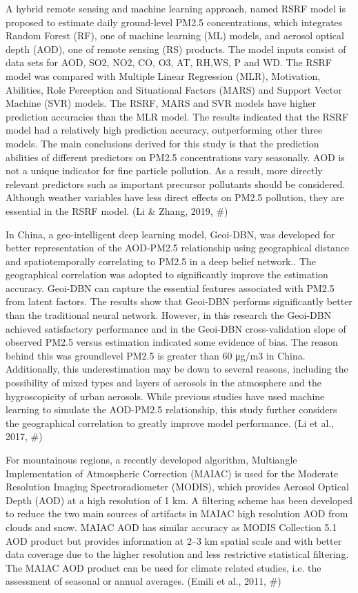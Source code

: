 A hybrid remote sensing and machine learning approach, named RSRF model is proposed to estimate daily ground-level PM2.5 concentrations, which integrates Random Forest (RF), one of machine learning (ML) models, and aerosol optical depth (AOD), one of remote sensing (RS) products. The model inputs consist of data sets for AOD, SO2, NO2, CO, O3, AT, RH,WS, P and WD. The RSRF model was compared with Multiple Linear Regression (MLR), Motivation, Abilities, Role Perception and Situational Factors (MARS) and Support Vector Machine (SVR) models. The RSRF, MARS and SVR models have higher prediction accuracies than the MLR model. The results indicated that the RSRF model had a relatively high prediction accuracy, outperforming other three models. The main conclusions derived for this study is that the prediction abilities of different predictors on PM2.5 concentrations vary seasonally. AOD is not a unique indicator for fine particle pollution. As a result, more directly relevant predictors such as important precursor pollutants should be considered. Although weather variables have less direct effects on PM2.5 pollution, they are essential in the RSRF model. (Li & Zhang, 2019, #)

In China, a geo-intelligent deep learning model, Geoi-DBN, was developed for better representation of  the AOD-PM2.5 relationship using geographical distance and spatiotemporally correlating to PM2.5 in a deep belief network.. The geographical correlation was adopted to significantly improve the estimation accuracy. Geoi-DBN can capture the essential features associated with PM2.5 from latent factors. The results show that Geoi-DBN performs significantly better than the traditional neural network. However, in this research  the Geoi-DBN achieved satisfactory performance and in the Geoi-DBN cross-validation slope of observed PM2.5 versus estimation indicated some evidence of bias. The reason behind this was groundlevel PM2.5 is greater than 60 μg/m3 in China. Additionally, this underestimation may be down to several reasons, including the possibility of mixed types and layers of aerosols in the atmosphere and the hygroscopicity of urban aerosols. While previous studies have used machine learning to simulate the AOD-PM2.5 relationship, this study further considers the geographical correlation to greatly improve model performance. (Li et al., 2017, #)

For mountainous regions, a recently developed algorithm, Multiangle Implementation of Atmospheric Correction (MAIAC) is used for the Moderate Resolution Imaging Spectroradiometer (MODIS), which provides Aerosol Optical Depth (AOD) at a high resolution of 1 km. A filtering scheme has been developed to reduce the two main sources of artifacts in MAIAC high resolution AOD from clouds and snow. MAIAC AOD has similar accuracy as MODIS Collection 5.1 AOD product but provides information at 2–3 km spatial scale and with better data coverage due to the higher resolution and less restrictive statistical filtering. The MAIAC AOD product can be used for climate related studies, i.e. the assessment of seasonal or annual averages. (Emili et al., 2011, #)

